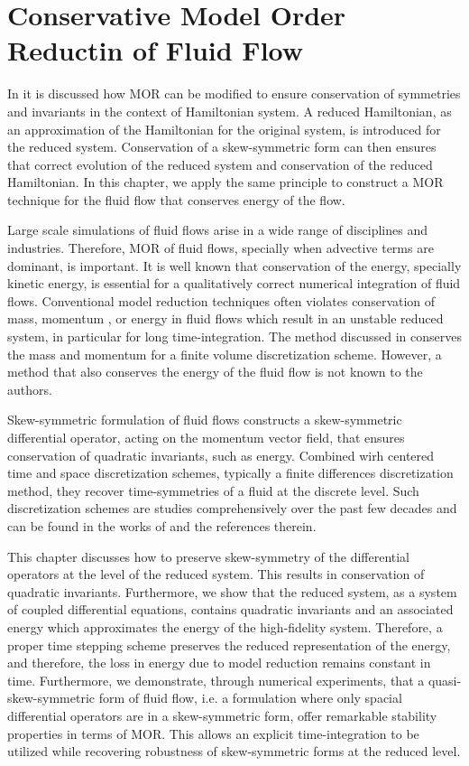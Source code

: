 \chapter{Conservative Model Order Reductin of Fluid Flow} \label{chapter:7}

In  it is discussed how MOR can be modified to ensure conservation of symmetries and invariants in the context of Hamiltonian system. A reduced Hamiltonian, as an approximation of the Hamiltonian for the original system, is introduced for the reduced system. Conservation of a skew-symmetric form can then ensures that correct evolution of the reduced system and conservation of the reduced Hamiltonian. In this chapter, we apply the same principle to construct a MOR technique for the fluid flow that conserves energy of the flow.

Large scale simulations of fluid flows arise in a wide range of disciplines and industries. Therefore, MOR of fluid flows, specially when advective terms are dominant, is important. It is well known that conservation of the energy, specially kinetic energy, is essential for a qualitatively correct numerical integration of fluid flows. Conventional model reduction techniques often violates conservation of mass, momentum \cite{carlberg2018conservative}, or energy in fluid flows which result in an unstable reduced system, in particular for long time-integration. The method discussed in \cite{carlberg2018conservative} conserves the mass and momentum for a finite volume discretization scheme. However, a method that also conserves the energy of the fluid flow is not known to the authors.

Skew-symmetric formulation of fluid flows constructs a skew-symmetric differential operator, acting on the momentum vector field, that ensures conservation of quadratic invariants, such as energy. Combined wirh centered time and space discretization schemes, typically a finite differences discretization method, they recover time-symmetries of a fluid at the discrete level. Such discretization schemes are studies comprehensively over the past few decades and can be found in the works of \cite{morinishi2010skew,morinishi1998fully,desjardins2008high,tadmor1984skew,reiss2014conservative} and the references therein.

This chapter discusses how to preserve skew-symmetry of the differential operators at the level of the reduced system. This results in conservation of quadratic invariants. Furthermore, we show that the reduced system, as a system of coupled differential equations, contains quadratic invariants and an associated energy which approximates the energy of the high-fidelity system. Therefore, a proper time stepping scheme preserves the reduced representation of the energy, and therefore, the loss in energy due to model reduction remains constant in time. Furthermore, we demonstrate, through numerical experiments, that a quasi-skew-symmetric form of fluid flow, i.e. a formulation where only spacial differential operators are in a skew-symmetric form, offer remarkable stability properties in terms of MOR. This allows an explicit time-integration to be utilized while recovering robustness of skew-symmetric forms at the reduced level.

